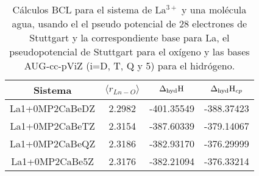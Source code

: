  \begin{center}                                                                            
 \begin{table}[h!]
 \centering
 \caption{\footnotesize C\'alculos BCL para el sistema de La$^{3+}$ y 
una mol\'ecula agua, usando el el pseudo potencial de 28 electrones 
de Stuttgart y la correspondiente base para La, el pseudopotencial
de Stuttgart para el ox\'igeno y las bases AUG-cc-pViZ (i=D, T, Q y 5) 
para el hidr\'ogeno.}                                                                  
 \begin{tabular}{c|ccc}\hline\hline                                                          
 Sistema & $\langle r_{Ln-O}\rangle$ & $\Delta_{\textnormal{hyd}}\textnormal{H}$ 
 & $\Delta_{\textnormal{hyd}}\textnormal{H}_{cp}$ \\ \hline                                               
La1+0MP2CaBeDZ & 2.2982 & -401.35549 & -388.37423 \\
La1+0MP2CaBeTZ & 2.3154 & -387.60339 & -379.14067 \\
La1+0MP2CaBeQZ & 2.3186 & -382.93170 & -376.29999 \\
La1+0MP2CaBe5Z & 2.3176 & -382.21094 & -376.33214 \\
 \hline \end{tabular}\label{tLaCB}      
 \end{table}                                                           
 \end{center}                                                                              
